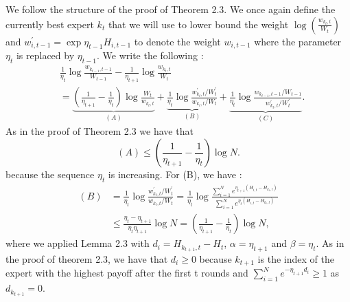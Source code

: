 \begin{solution}[]
	We follow the structure of the proof of Theorem 2.3. We once again define the currently best expert $ k_t $ that we will use to lower bound the weight $ \log(\frac{w_{k_t,t}}{W_t}) $ and $ w^{'}_{i,t-1} = \exp{\eta_{t-1}H_{i,t-1}} $ to denote the weight $ w_{i,t-1} $ where the parameter $ \eta_t $ is replaced by $ \eta_{t-1} $. We write the following :
\begin{align*}
	&\frac{1}{\eta_t} \log \frac{w_{k_{t-1},t-1}}{W_{t-1}} - \frac{1}{\eta_{t+1}}\log \frac{w_{k_t,t}}{W_t} \\
	&= \underbrace{\left( \frac{1}{\eta_{t+1}} - \frac{1}{\eta_t} \right) \log \frac{W_t}{w_{k_t,t}}}_{(A)} + \underbrace{\frac{1}{\eta_t}\log \frac{w^{'}_{k_t,t}/W^{'}_t}{w_{k_t,t}/W_t}}_{(B)} + \underbrace{\frac{1}{\eta_t}\log \frac{w_{k_{t-1},t-1}/W_{t-1}}{w^{'}_{k_t,t}/W^{'}_t}}_{(C)}.
\end{align*}
As in the proof of Theorem 2.3 we have that 
\begin{equation*}
	(A) \leq \left( \frac{1}{\eta_{t+1}}-\frac{1}{\eta_t} \right)\log N.
\end{equation*}
because the sequence $ \eta_t $ is increasing.
For (B), we have :
\begin{align*}
	(B) &= \frac{1}{\eta_t} \log \frac{w^{'}_{k_t,t}/W^{'}_t}{w_{k_t,t}/W_t} = \frac{1}{\eta_t}\log \frac{\sum_{i=1}^{N}e^{\eta_{t+1}(H_{i,t}-H_{k_t,t})}}{\sum_{i=1}^{N} e^{\eta_t (H_{i,t}-H_{k_t,t})}} \\
	    & \leq \frac{\eta_t - \eta_{t+1}}{\eta_t \eta_{t+1}}\log N = \left( \frac{1}{\eta_{t+1}} - \frac{1}{\eta_t} \right) \log N,
\end{align*}
where we applied Lemma 2.3 with $ d_i = H_{k_{t+1},t} - H_t$, $ \alpha = \eta_{t+1} $ and $ \beta = \eta_t $. As in the proof of theorem 2.3, we have that $ d_i \geq 0$ because $k_{t+1} $ is the index of the expert with the highest payoff after the first t rounds and $ \sum_{i=1}^{N}e^{-\eta_{t+1}d_i} \geq 1 $ as $ d_{k_{t+1}} =0 $. 


\end{solution}
